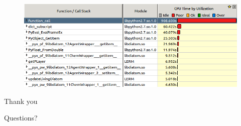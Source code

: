 \documentclass[t]{beamer}
\begin{document}
\begin{frame}[c]

\begin{figure}[ht!]
  \begin{center}
    \includegraphics[width=\textwidth,natwidth=696,natheight=271]{images/vtune-cython-pure.png}
  \end{center}
\end{figure}

\end{frame}


\begin{frame}[c]

\begin{center}
{\fontsize{60pt}{1em}\selectfont Thank you}
\end{center}

\end{frame}


\begin{frame}[c]

\begin{center}
{\fontsize{48pt}{1em}\selectfont Questions?}
\end{center}

\end{frame}
\end{document}
